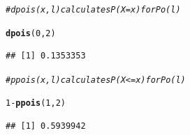 \documentclass[t,xcolor=pdftex,dvipsnames,table]{beamer}
\makeatletter
\newcommand{\hlnum}[1]{\textcolor[rgb]{0.686,0.059,0.569}{#1}}%
\newcommand{\hlcom}[1]{\textcolor[rgb]{0.678,0.584,0.686}{\textit{#1}}}%
\newcommand{\hlopt}[1]{\textcolor[rgb]{0,0,0}{#1}}%
\newcommand{\hlstd}[1]{\textcolor[rgb]{0.345,0.345,0.345}{#1}}%
\newcommand{\hlkwd}[1]{\textcolor[rgb]{0.737,0.353,0.396}{\textbf{#1}}}%
\newenvironment{kframe}{%
 \def\at@end@of@kframe{}%
 \ifinner\ifhmode%
  \def\at@end@of@kframe{\end{minipage}}%
  \begin{minipage}{\columnwidth}%
 \fi\fi%
 \def\FrameCommand##1{\hskip\@totalleftmargin \hskip-\fboxsep
 \colorbox{shadecolor}{##1}\hskip-\fboxsep
     \hskip-\linewidth \hskip-\@totalleftmargin \hskip\columnwidth}%
 \MakeFramed {\advance\hsize-\width
   \@totalleftmargin\z@ \linewidth\hsize
   \@setminipage}}%
 {\par\unskip\endMakeFramed%
 \at@end@of@kframe}
\newenvironment{knitrout}{}{} %
\makeatother
\begin{document}
\begin{frame}[fragile]\frametitle{}
\begin{knitrout}
\color{fgcolor}\begin{kframe}
\begin{alltt}
\hlcom{# dpois(x,l) calculates P(X=x) for Po(l)}

\hlkwd{dpois}\hlstd{(}\hlnum{0}\hlstd{,}\hlnum{2}\hlstd{)}
\end{alltt}
\begin{verbatim}
## [1] 0.1353353
\end{verbatim}
\end{kframe}
\end{knitrout}

\begin{knitrout}
\color{fgcolor}\begin{kframe}
\begin{alltt}
\hlcom{# ppois(x,l) calculates P(X<=x) for Po(l)}

\hlnum{1}\hlopt{-}\hlkwd{ppois}\hlstd{(}\hlnum{1}\hlstd{,}\hlnum{2}\hlstd{)}
\end{alltt}
\begin{verbatim}
## [1] 0.5939942
\end{verbatim}
\end{kframe}
\end{knitrout}
\end{frame}
\end{document}
